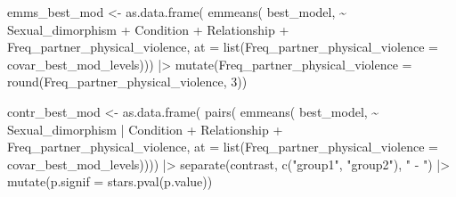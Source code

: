 \documentclass[
  bookmarksnumbered]{article}
\newenvironment{Shaded}{\begin{snugshade}}{\end{snugshade}}
\newcommand{\AttributeTok}[1]{\textcolor[rgb]{0.80,0.80,0.80}{#1}}
\newcommand{\DecValTok}[1]{\textcolor[rgb]{0.86,0.86,0.80}{#1}}
\newcommand{\FunctionTok}[1]{\textcolor[rgb]{0.94,0.94,0.56}{#1}}
\newcommand{\NormalTok}[1]{\textcolor[rgb]{0.80,0.80,0.80}{#1}}
\newcommand{\OtherTok}[1]{\textcolor[rgb]{0.94,0.94,0.56}{#1}}
\newcommand{\SpecialCharTok}[1]{\textcolor[rgb]{0.86,0.64,0.64}{#1}}
\newcommand{\StringTok}[1]{\textcolor[rgb]{0.80,0.58,0.58}{#1}}
\begin{document}
\begin{Shaded}
\begin{Highlighting}[]
\NormalTok{  emms\_best\_mod }\OtherTok{\textless{}{-}} \FunctionTok{as.data.frame}\NormalTok{(}
    \FunctionTok{emmeans}\NormalTok{(}
\NormalTok{      best\_model,}
      \SpecialCharTok{\textasciitilde{}}\NormalTok{ Sexual\_dimorphism }\SpecialCharTok{+}\NormalTok{ Condition }\SpecialCharTok{+}\NormalTok{ Relationship }\SpecialCharTok{+}\NormalTok{ Freq\_partner\_physical\_violence,}
      \AttributeTok{at =} \FunctionTok{list}\NormalTok{(}\AttributeTok{Freq\_partner\_physical\_violence =}\NormalTok{ covar\_best\_mod\_levels))) }\SpecialCharTok{|\textgreater{}} 
    \FunctionTok{mutate}\NormalTok{(}\AttributeTok{Freq\_partner\_physical\_violence =} \FunctionTok{round}\NormalTok{(Freq\_partner\_physical\_violence, }\DecValTok{3}\NormalTok{))}
  
\NormalTok{  contr\_best\_mod }\OtherTok{\textless{}{-}} \FunctionTok{as.data.frame}\NormalTok{(}
    \FunctionTok{pairs}\NormalTok{(}
      \FunctionTok{emmeans}\NormalTok{(}
\NormalTok{        best\_model,}
        \SpecialCharTok{\textasciitilde{}}\NormalTok{ Sexual\_dimorphism }\SpecialCharTok{|}\NormalTok{ Condition }\SpecialCharTok{+}\NormalTok{ Relationship }\SpecialCharTok{+}\NormalTok{ Freq\_partner\_physical\_violence,}
        \AttributeTok{at =} \FunctionTok{list}\NormalTok{(}\AttributeTok{Freq\_partner\_physical\_violence =}\NormalTok{ covar\_best\_mod\_levels)))) }\SpecialCharTok{|\textgreater{}}
    \FunctionTok{separate}\NormalTok{(contrast, }\FunctionTok{c}\NormalTok{(}\StringTok{"group1"}\NormalTok{, }\StringTok{"group2"}\NormalTok{), }\StringTok{" {-} "}\NormalTok{) }\SpecialCharTok{|\textgreater{}} 
    \FunctionTok{mutate}\NormalTok{(}\AttributeTok{p.signif =} \FunctionTok{stars.pval}\NormalTok{(p.value))}
  

\end{Highlighting}
\end{Shaded}
\end{document}

